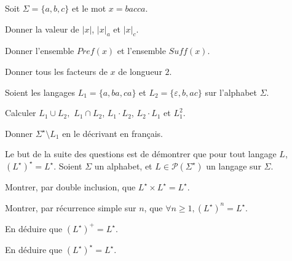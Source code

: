 
\begingroup

\begin{exercice}\label{exo:introduction/languages/revision}
  
  Soit $\Sigma = \{a,b,c\}$ et le mot $x = bacca$.

  \begin{questions}
  \item Donner la valeur de $|x|$, $|x|_a$ et $|x|_c$.
  \item Donner l’ensemble $\mathit{Pref}(x)$ et l’ensemble $\mathit{Suff}(x)$.
  \item Donner tous les facteurs de $x$ de longueur $2$.
  \end{questions}

  Soient les langages $L_1 = \{a,ba,ca\}$ et $L_2 = \{\varepsilon,b,ac\}$ sur l’alphabet $\Sigma$.

  \begin{questions}
  \item Calculer $L_1 \cup L_2,$ $L_1 \cap L_2$, $L_1 \cdot L_2$, $L_2 \cdot L_1$ et $L_1^2$.
  \item Donner $\Sigma^\star \setminus L_1$ en le décrivant en français.
  \end{questions}

  Le but de la suite des questions est de démontrer que pour tout langage $L$, $(L^\star)^\star = L^\star$.
  Soient $\Sigma$ un alphabet, et $L \in \mathscr{P}(\Sigma^\star)$ un langage sur $\Sigma$.  

  \begin{questions}
  \item Montrer, par double inclusion, que $L^\star \times L^\star = L^\star$. 
  \item Montrer, par récurrence simple sur $n$, que $\forall n \ge 1, (L^\star)^n = L^\star$.
  \item En déduire que $(L^\star)^+ = L^\star$.
  \item En déduire que $(L^\star)^\star = L^\star$.
  \end{questions}

\end{exercice}

